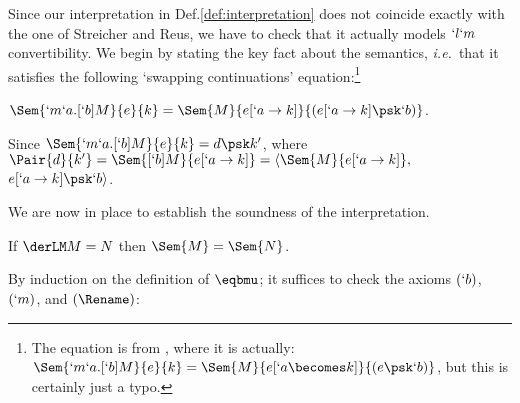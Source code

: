 \documentclass{CSML}
\def\ie{\emph{i.e.}}
\begin{document}
\noindent Since our interpretation in Def.\skp\ref{def:interpretation} does not coincide exactly with the one of Streicher and Reus, we have to check that it actually models $`l`m$ convertibility.
We begin by stating the key fact about the semantics, \ie~that it satisfies the following `swapping continuations' equation:\footnote{The equation is from \cite{Streicher-Reus'98}, where it is actually:
$ \Sem{ `m`a.[`b]M }{ e }{ k } = \Sem{ M }{ e[`a \becomes k] }{ (e\psk `b)}$, but this is certainly just a typo.}

 \begin{lem} \label{lem:sem-shortcut}
$ \Sem{ `m`a.[`b]M }{ e }{ k } = \Sem{ M }{ e[`a \to k] }{ (e[`a \to k] \psk `b) }$.
 \end{lem}

 \begin{Proof}
Since $\Sem{ `m`a.[`b]M }{ e }{ k } = d\psk k'$, where
$ \Pair{ d }{ k' } = \Sem{ [`b]M}{ e[`a\to k] } = \langle \Sem{ M }{ e[`a\to k] } ,$ \\ $ e[`a\to k]\psk `b \rangle $. %
 \end{Proof}

We are now in place to establish the soundness of the interpretation.

 \begin{thm} \label{thm:sem_soundness}
If $ \derLM M = N $ then $ \Sem{ M } = \Sem{ N } $.
 \end{thm}

\proof %
By induction on the definition of $\eqbmu$; it suffices to check the axioms $(`b)$, $(`m)$, and $(\Rename)$:
\end{document}
